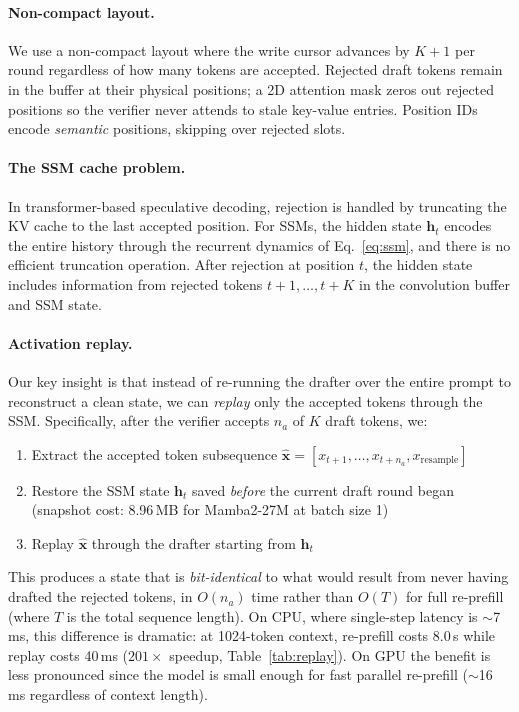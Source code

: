 \paragraph{Non-compact layout.}
We use a non-compact layout where the write cursor advances by $K+1$ per round regardless of how many tokens are accepted.
Rejected draft tokens remain in the buffer at their physical positions; a 2D attention mask zeros out rejected positions so the verifier never attends to stale key-value entries.
Position IDs encode \emph{semantic} positions, skipping over rejected slots.

\paragraph{The SSM cache problem.}
In transformer-based speculative decoding, rejection is handled by truncating the KV cache to the last accepted position.
For SSMs, the hidden state $\mathbf{h}_t$ encodes the entire history through the recurrent dynamics of Eq.~\eqref{eq:ssm}, and there is no efficient truncation operation.
After rejection at position $t$, the hidden state includes information from rejected tokens $t+1, \ldots, t+K$ in the convolution buffer and SSM state.

\paragraph{Activation replay.}
Our key insight is that instead of re-running the drafter over the entire prompt to reconstruct a clean state, we can \emph{replay} only the accepted tokens through the SSM.
Specifically, after the verifier accepts $n_a$ of $K$ draft tokens, we:
\begin{enumerate}
  \item Extract the accepted token subsequence $\hat{\mathbf{x}} = [x_{t+1}, \ldots, x_{t+n_a}, x_{\mathrm{resample}}]$
  \item Restore the SSM state $\mathbf{h}_t$ saved \emph{before} the current draft round began (snapshot cost: 8.96\,MB for Mamba2-27M at batch size 1)
  \item Replay $\hat{\mathbf{x}}$ through the drafter starting from $\mathbf{h}_t$
\end{enumerate}
This produces a state that is \emph{bit-identical} to what would result from never having drafted the rejected tokens, in $O(n_a)$ time rather than $O(T)$ for full re-prefill (where $T$ is the total sequence length).
On CPU, where single-step latency is $\sim$7\,ms, this difference is dramatic: at 1024-token context, re-prefill costs 8.0\,s while replay costs 40\,ms ($201\times$ speedup, Table~\ref{tab:replay}).
On GPU the benefit is less pronounced since the model is small enough for fast parallel re-prefill ($\sim$16\,ms regardless of context length).

